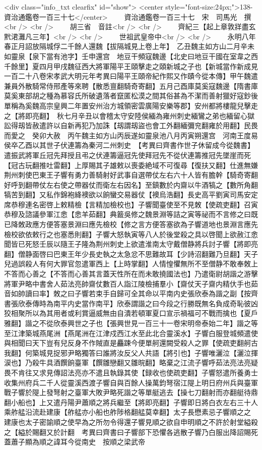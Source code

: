 <div class="info_txt clearfix" id="show">
<center style="font-size:24px;">138-資治通鑑卷一百三十七</center>
  　　資治通鑑卷一百三十七　宋　司馬光　撰<br />
<br />
　　胡三省　音註<br />
<br />
　　齊紀三【起上章敦牂盡玄黓涒灘凡三年】<br />
<br />
　　世祖武皇帝中<br />
<br />
　　永明八年春正月詔放隔城俘二千餘人還魏【拔隔城見上卷上年】　乙丑魏主如方山二月辛未如靈泉【泉下當有池字】壬申還宫　地豆干頻寇魏邊【北史曰地豆干國在室韋之西千餘里】夏四月甲戌魏征西大將軍陽平王頤擊走之頤新城之子也【新城當作新成見一百二十八卷宋孝武大明元年考異曰陽平王頤帝紀作熙又作賾今從本傳】甲午魏遣兼員外散騎常侍邢產等來聘【散悉亶翻騎奇寄翻】五月己酉庫莫奚寇魏邊【隋書庫莫奚東部胡之種為慕容氏所破遺落者竄匿松漠之間其俗甚為不潔而善射獵好寇鈔後單稱為奚魏高宗皇興二年置安州治方城領密雲廣陽安樂等郡】安州都將樓龍兒擊走之【將即亮翻】　秋七月辛丑以會稽太守安陸侯緬為雍州刺史緬鸞之弟也緬留心獄訟得刼皆赦遣許以自新再犯乃加誅【刼謂刼盜也會工外翻緬彌兖翻雍於用翻】民畏而愛之　癸卯大赦　丙午魏主如方山丙辰遂如靈泉池八月丙寅朔還宫　河南王度易侯卒乙酉以其世子伏連籌為秦河二州刺史　【考異曰齊書作世子休留成今從魏書】遣振武將軍丘冠先拜授且弔之伏連籌逼冠先使拜冠先不從伏連籌推冠先墜崖而死【冠古玩翻推吐雷翻】上厚賜其子雄敕以喪委絶域不可復尋【復扶又翻】仕進無嫌　荆州刺使巴東王子響有勇力善騎射好武事自選帶仗左右六十人皆有膽幹【騎奇寄翻好呼到翻帶仗左右使之帶器仗而衛左右因名】至鎮數於内齋以牛酒犒之【數所角翻犒苦到翻】又私作錦袍絳襖欲以餉蠻交易器仗【襖烏浩翻】長史高平劉寅司馬安定席恭穆連名密啓上敕精檢【言精加檢校也】子響聞臺使至不見敇【使疏吏翻】召寅恭穆及諮議參軍江悆【悆羊茹翻】典籖吳修之魏景淵等詰之寅等祕而不言修之曰既已降敇政應方便答塞景淵曰應先檢校【修之言方便答塞欲為子響道地也景淵言應先檢校欲依敕行之也塞悉則翻】子響大怒執寅等八人於後堂殺之具以啓聞上欲赦江悆聞皆已死怒壬辰以隨王子隆為荆州刺史上欲遣淮南太守戴僧静將兵討子響【將即亮翻】僧静面啓曰巴東王年少長史執之太急忿不思難故耳【少詩沼翻難乃旦翻】天子兒過誤殺人有何大罪官忽遣軍西上【上時掌翻】人情惶懼無所不至僧静不敢奉敇上不答而心善之【不答而心善其言蓋天性所在而未敢撓國法也】乃遣衛尉胡諧之游擊將軍尹略中書舍人茹法亮帥齋仗數百人詣江陵檢捕羣小【齋仗天子齋内精㐲手也茹音如帥讀曰率】敇之曰子響若束手自歸可全其命以平南内史張欣泰為諧之副【按齊書張欣泰傳時為南平内史當作南平】欣泰謂諧之曰今段之行勝既無名負成奇恥彼凶狡相聚所以為其用者或利賞逼威無由自潰若頓軍夏口宣示禍福可不戰而擒也【夏戶雅翻】諧之不從欣泰興世之子也【張興世見一百三十一卷宋明帝泰始二年】諧之等至江津築城燕尾洲【燕尾洲在江津戍西江水至此北合靈溪水】子響白服登城頻遣使與相聞曰天下豈有兒反身不作賊直是麤踈今便單舸還闕受殺人之罪【使疏吏翻舸古我翻】何築城見捉邪尹略獨答曰誰將汝反父人共語【將引也】子響唯灑泣【灑泣揮涙也】乃殺牛具酒饌餉臺軍【饌雛戀翻又雛晥翻】略棄之江流子響呼茹法亮法亮疑畏不肯往又求見傳詔法亮亦不遣且執錄其使【録收也使疏吏翻】子響怒遣所養勇士收集州府兵二千人從靈溪西渡子響自與百餘人操萬鈞弩宿江隄上明日府州兵與臺軍戰子響於隄上發弩射之臺軍大敗尹略死諧之等單艇逃去【操七刀翻射而亦翻艇待鼎翻小船也】上又遣丹陽尹蕭順之將兵繼至【將即亮翻】子響即日將白衣左右三十人乘舴艋沿流赴建康【舴艋亦小船也舴陟格翻艋莫幸翻】太子長懋素忌子響順之之建康也太子密諭順之使早為之所勿令得還子響見順之欲自申明順之不許於射堂縊殺之【縊於賜翻又於計翻　考異曰齊書曰子響部下恐懼各逃散子響乃白服出降詔賜死蓋蕭子顯為順之諱耳今從南史　按順之梁武帝